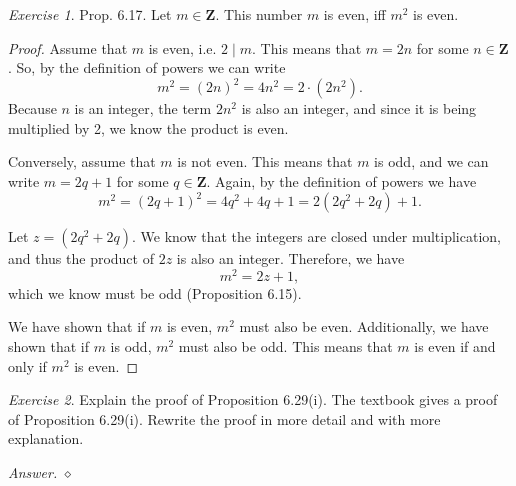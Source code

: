 \documentclass[12pt,oneside]{amsart}
\theoremstyle{remark}
\newtheorem{exer}{Exercise}
\newcommand{\bfZ}{\mathbf{Z}}
\newenvironment{answer}{\bigskip\noindent\emph{Answer.}}{\hfill$\diamond$\newline}
\begin{document}
%
%
%
%
\newpage
\begin{exer}
Prop. 6.17. Let $m \in \bfZ$. This number $m$ is even, iff $m^2$ is even.
\end{exer}

%
\begin{proof}
Assume that $m$ is even, i.e. $2 \mid m$. This means that $m = 2n$ for some $n \in \bfZ$. So, by the definition of powers we can write \[ m^2 = (2n)^2 = 4n^2 = 2 \cdot (2n^2). \] Because $n$ is an integer, the term $2n^2$ is also an integer, and since it is being multiplied by 2, we know the product is even.

Conversely, assume that $m$ is not even. This means that $m$ is odd, and we can write $m = 2q + 1$ for some $q \in \bfZ$. Again, by the definition of powers we have \[ m^2 = (2q + 1)^2 = 4q^2 + 4q + 1 = 2(2q^2 + 2q) + 1. \]

Let $z = (2q^2 + 2q)$. We know that the integers are closed under multiplication, and thus the product of $2z$ is also an integer. Therefore, we have \[ m^2 = 2z +1, \] which we know must be odd (Proposition 6.15).

We have shown that if $m$ is even, $m^2$ must also be even. Additionally, we have shown that if $m$ is odd, $m^2$ must also be odd. This means that $m$ is even if and only if $m^2$ is even.
\end{proof}

%
%
%
%
\newpage
\begin{exer}
Explain the proof of Proposition 6.29(i). The textbook gives a proof of Proposition 6.29(i). Rewrite the proof in more detail and with more explanation.
\end{exer}

\begin{answer}
\end{answer}
\end{document}

